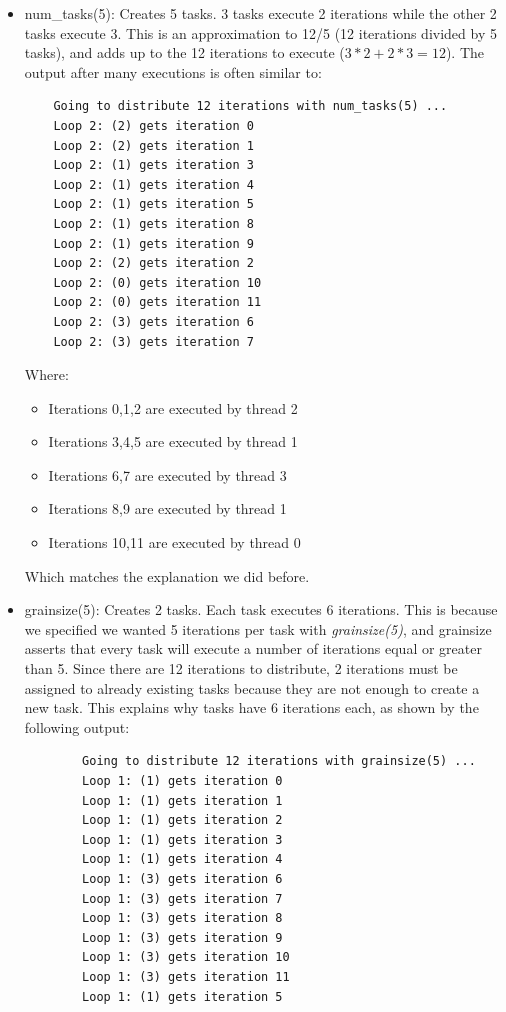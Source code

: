 \documentclass[12]{article}
\begin{document}
\begin{itemize}
    \item num\_tasks(5): Creates 5 tasks. 3 tasks execute 2 iterations while the other 2 tasks execute 3. This is an approximation to 12/5 (12 iterations divided by 5 tasks), and adds up to the 12 iterations to execute ($3*2 + 2*3 = 12$). The output after many executions is often similar to:

    \begin{lstlisting}
    Going to distribute 12 iterations with num_tasks(5) ...
    Loop 2: (2) gets iteration 0
    Loop 2: (2) gets iteration 1
    Loop 2: (1) gets iteration 3
    Loop 2: (1) gets iteration 4
    Loop 2: (1) gets iteration 5
    Loop 2: (1) gets iteration 8
    Loop 2: (1) gets iteration 9
    Loop 2: (2) gets iteration 2
    Loop 2: (0) gets iteration 10
    Loop 2: (0) gets iteration 11
    Loop 2: (3) gets iteration 6
    Loop 2: (3) gets iteration 7
    \end{lstlisting}

    Where: 
    \begin{itemize}
        \item Iterations 0,1,2 are executed by thread 2
        \item Iterations 3,4,5 are executed by thread 1
        \item Iterations 6,7 are executed by thread 3
        \item Iterations 8,9 are executed by thread 1
        \item Iterations 10,11 are executed by thread 0
    \end{itemize}
    Which matches the explanation we did before.

    \item grainsize(5): Creates 2 tasks. Each task executes 6 iterations. This is because we specified we wanted 5 iterations per task with \textit{grainsize(5)}, and grainsize asserts that every task will execute a number of iterations equal or greater than 5. Since there are 12 iterations to distribute, 2 iterations must be assigned to already existing tasks because they are not enough to create a new task. This explains why tasks have 6 iterations each, as shown by the following output:
    
    \begin{lstlisting}
        Going to distribute 12 iterations with grainsize(5) ...
        Loop 1: (1) gets iteration 0
        Loop 1: (1) gets iteration 1
        Loop 1: (1) gets iteration 2
        Loop 1: (1) gets iteration 3
        Loop 1: (1) gets iteration 4
        Loop 1: (3) gets iteration 6
        Loop 1: (3) gets iteration 7
        Loop 1: (3) gets iteration 8
        Loop 1: (3) gets iteration 9
        Loop 1: (3) gets iteration 10
        Loop 1: (3) gets iteration 11
        Loop 1: (1) gets iteration 5
    \end{lstlisting}


\end{itemize}
\end{document}
